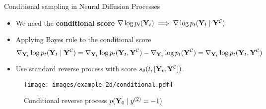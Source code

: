 \begin{frame}{Conditional sampling in Neural Diffusion Processes}
\begin{itemize}
\item We need the \textbf{conditional score}
$
\nabla \log p_t(\mathbf{Y}_t) \implies \nabla \log p_t(\mathbf{Y}_t \mid \mathbf{Y}^\mathcal{C})
$
\item Applying Bayes rule to the conditional score
\begin{equation*}
\nabla_{\mathbf{Y}_t} \log p_t(\mathbf{Y}_t \mid \mathbf{Y}^\mathcal{C})
= \nabla_{\mathbf{Y}_t} \log p_t(\mathbf{Y}_t, \mathbf{Y}^\mathcal{C}) - \nabla_{\mathbf{Y}_t} \log p_t(\mathbf{Y}^\mathcal{C})
= \nabla_{\mathbf{Y}_t} \log p_t(\mathbf{Y}_t, \mathbf{Y}^\mathcal{C})
\end{equation*}
\item Use standard reverse process with score $s_\theta(t, [\mathbf{Y}_t, \mathbf{Y}^\mathcal{C}])$.
\end{itemize}
\vspace{5mm}
\begin{figure}
\centering
\texttt{[image: images/example\_2d/conditional.pdf]}
\caption{Conditional reverse process $p(\mathbf{Y}_0 \mid y^{(2)}=-1)$}
\end{figure}
\end{frame}

